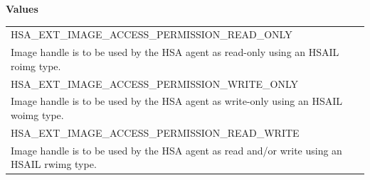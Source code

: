 \documentclass[final]{book}
\newcommand{\reftyp}[1]{#1}
\newcommand{\refenu}[1]{\reftyp{#1}}
\begin{document}
\noindent\textbf{Values}\\[-5mm]
\begin{longtable}{@{\hspace{2em}}p{\linewidth-2em}}
\hspace{-2em}\refenu{HSA_\-EXT_\-IMAGE_\-ACCESS_\-PERMISSION_\-READ_\-ONLY}\\Image handle is to be used by the HSA agent as read-only using an HSAIL roimg type.\\[2mm]
\hspace{-2em}\refenu{HSA_\-EXT_\-IMAGE_\-ACCESS_\-PERMISSION_\-WRITE_\-ONLY}\\Image handle is to be used by the HSA agent as write-only using an HSAIL woimg type.\\[2mm]
\hspace{-2em}\refenu{HSA_\-EXT_\-IMAGE_\-ACCESS_\-PERMISSION_\-READ_\-WRITE}\\Image handle is to be used by the HSA agent as read and/or write using an HSAIL rwimg type.
\end{longtable}
\end{document}
